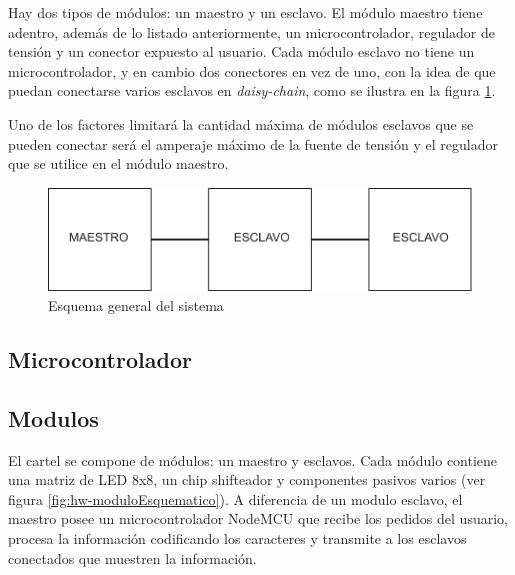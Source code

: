Hay dos tipos de módulos: un maestro y un esclavo. El módulo maestro tiene adentro, además de lo listado anteriormente, un microcontrolador, regulador de tensión y un conector expuesto al usuario. Cada módulo esclavo no tiene un microcontrolador, y en cambio dos conectores en vez de uno, con la idea de que puedan conectarse varios esclavos en \emph{daisy-chain}, como se ilustra en la figura \ref{fig:esquema-general}.

Uno de los factores limitará la cantidad máxima de módulos esclavos que se pueden conectar será el amperaje máximo de la fuente de tensión y el regulador que se utilice en el módulo maestro.

\begin{figure}[ht!]
	\begin{center}
		\includegraphics[scale=1]{imagenes/hw/esquema-general.pdf}
		\caption{Esquema general del sistema}
		\label{fig:esquema-general}
	\end{center}
\end{figure}

\subsection{Microcontrolador}

\subsection{Modulos}
El cartel se compone de módulos: un maestro y esclavos. Cada módulo contiene una matriz de LED 8x8, un chip shifteador \cite{MAX7219} y componentes pasivos varios (ver figura \ref{fig:hw-moduloEsquematico}). A diferencia de un modulo esclavo, el maestro posee un microcontrolador NodeMCU que recibe los pedidos del usuario, procesa la información codificando los caracteres y transmite a los esclavos conectados que muestren la información.

